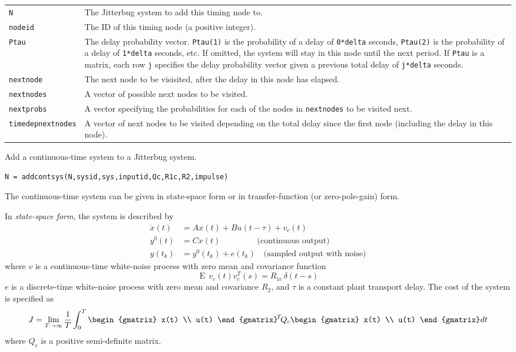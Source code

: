 \documentclass[final,twoside]{rapport}  %
\DeclareMathOperator{\E}{E}
\begin{document}
\args
\begin{tabularx}{\hsize}{l>{\raggedright\arraybackslash}X}
  {\tt N}   &  The {\sc Jitterbug} system to add this timing node to.\\
  {\tt nodeid} &   The ID of this timing node (a positive integer).\\
  {\tt Ptau} & The delay probability vector. {\tt Ptau(1)} is the
  probability of a delay of {\tt 0*delta} seconds, {\tt Ptau(2)} is
  the probability of a delay of {\tt 1*delta} seconds, etc. If
  omitted, the system will stay in this node until the next period.
  If {\tt Ptau} is a matrix, each row {\tt j} specifies the delay
  probability vector given a previous total delay of {\tt j*delta} seconds.
 \\
  {\tt nextnode} & 
  The next node to be visisited, after the delay in this node has
  elapsed. \\
  {\tt nextnodes} & A vector of possible next nodes to be visited.\\
  {\tt nextprobs} & A vector specifying the probabilities for each of
  the nodes in {\tt nextnodes} to be visited next.\\
  {\tt timedepnextnodes} & A vector of next nodes to be visited
  depending on the total delay since the first node (including the
  delay in this node).
\end{tabularx}


\label{sec:addcontsys}

\purpose
Add a continuous-time system to a {\sc Jitterbug} system.

\syntax
\begin{verbatim}
N = addcontsys(N,sysid,sys,inputid,Qc,R1c,R2,impulse)
\end{verbatim}

\descr
The continuous-time system can be given in state-space form or
in transfer-function (or zero-pole-gain) form.

In {\em state-space form}, the system is described by
\[
\begin{aligned}
\dot x(t) &= A x(t) + B u(t-\tau) + v_c(t) \\
y^0(t) &= C x(t) \qquad\qquad\;\,  \text{(continuous output)} \\
y(t_k) &= y^0(t_k) + e(t_k) \quad \text{(sampled output with noise)}
\end{aligned}
\]
where $v$ is a continuous-time white-noise process with zero
mean and covariance function
\[
\E \, v_c(t)v_c^T\!(s) = R_{1c} \, \delta(t-s)
\]
$e$ is a discrete-time white-noise process with zero mean and covariance $R_2$,
and $\tau$ is a constant plant transport delay. The cost of the system is
specified as
\[
J = \lim_{T \rightarrow \infty} \frac{1}{T} \int_0^T
  \begin{gmatrix} x(t) \\ u(t) \end{gmatrix}^{\!T} \! Q_c \begin{gmatrix} x(t)
    \\ u(t) \end{gmatrix} dt
\]
where $Q_c$ is a positive semi-definite matrix.
\end{document}
